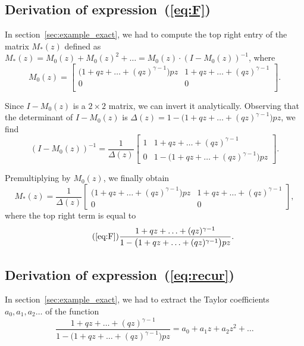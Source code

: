 \documentclass{article}
\begin{document}
\subsection{Derivation of expression~(\ref{eq:F})}
\label{app_ex1}

In section~\ref{sec:example_exact}, we had to compute the top right entry
of the matrix $M_*(z)$ defined as $M_*(z) = M_0(z) + M_0(z)^2 + \ldots =
M_0(z) \cdot (I-M_0(z))^{-1}$, where
\begin{equation*}
M_0(z) =
\begin{bmatrix}
\big( 1+qz+\ldots+(qz)^{\gamma-1}
\big) pz  & 1+qz+\ldots+(qz)^{\gamma-1} \\
0 & 0 \\
\end{bmatrix}.
\end{equation*}

Since $I-M_0(z)$ is a $2\times2$ matrix, we can invert it analytically.
Observing that the determinant of $I-M_0(z)$ is $\Delta(z) = 1-\big(
1+qz+\ldots+(qz)^{\gamma-1}\big) pz$, we find
\begin{equation*}
(I-M_0(z))^{-1} = \frac{1}{\Delta(z)}
\begin{bmatrix}
1 & 1+qz+\ldots+(qz)^{\gamma-1} \\
0 & 1-\big( 1+qz+\ldots+(qz)^{\gamma-1} \big) pz
\end{bmatrix}.
\end{equation*}

Premultiplying by $M_0(z)$, we finally obtain
\begin{equation*}
M_*(z) = \frac{1}{\Delta(z)}
\begin{bmatrix}
\big( 1+qz+\ldots+(qz)^{\gamma-1} \big) pz &
1+qz+\ldots+(qz)^{\gamma-1} \\
0 & 0 \end{bmatrix},
\end{equation*}
where the top right term is equal to
\begin{equation}
\tag{\ref{eq:F}}
\frac{1+qz+\ldots+(qz)^{\gamma-1}}
{1-\big( 1+qz+\ldots+(qz)^{\gamma-1} \big) pz}.
\end{equation}


\subsection{Derivation of expression~(\ref{eq:recur})}
\label{app_rec}

In section~\ref{sec:example_exact}, we had to extract the Taylor
coefficients $a_0, a_1, a_2 \ldots$ of the function
\begin{equation*}
\frac{1+qz+\ldots+(qz)^{\gamma-1}}
  {1-\big(1+qz+\ldots+(qz)^{\gamma-1} \big) pz} =
  a_0 + a_1z +a_2z^2 + \ldots
\end{equation*}
\end{document}
